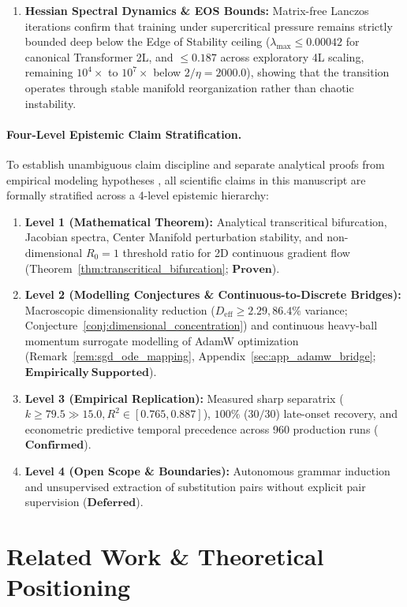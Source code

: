 \documentclass{article}
\theoremstyle{plain}
\theoremstyle{definition}
\begin{document}
\begin{enumerate}[leftmargin=*,itemsep=2pt]
    \item \textbf{Hessian Spectral Dynamics \& EOS Bounds:} Matrix-free Lanczos iterations confirm that training under supercritical pressure remains strictly bounded deep below the Edge of Stability ceiling ($\lambda_{\text{max}} \le 0.00042$ for canonical Transformer 2L, and $\le 0.187$ across exploratory 4L scaling, remaining $10^4\times$ to $10^7\times$ below $2/\eta = 2000.0$), showing that the transition operates through stable manifold reorganization rather than chaotic instability.
\end{enumerate}

\paragraph{Four-Level Epistemic Claim Stratification.}
To establish unambiguous claim discipline and separate analytical proofs from empirical modeling hypotheses \citep{Basri2026CompositionalPreprint}, all scientific claims in this manuscript are formally stratified across a 4-level epistemic hierarchy:
\begin{enumerate}[leftmargin=*,noitemsep]
    \item \textbf{Level 1 (Mathematical Theorem):} Analytical transcritical bifurcation, Jacobian spectra, Center Manifold perturbation stability, and non-dimensional $R_0 = 1$ threshold ratio for 2D continuous gradient flow (Theorem~\ref{thm:transcritical_bifurcation}; $\mathbf{Proven}$).
    \item \textbf{Level 2 (Modelling Conjectures \& Continuous-to-Discrete Bridges):} Macroscopic dimensionality reduction ($D_{\text{eff}} \ge 2.29, 86.4\%$ variance; Conjecture~\ref{conj:dimensional_concentration}) and continuous heavy-ball momentum surrogate modelling of AdamW optimization (Remark~\ref{rem:sgd_ode_mapping}, Appendix~\ref{sec:app_adamw_bridge}; $\mathbf{Empirically\ Supported}$).
    \item \textbf{Level 3 (Empirical Replication):} Measured sharp separatrix ($k \ge 79.5 \gg 15.0, R^2 \in [0.765, 0.887]$), $100\%$ ($30/30$) late-onset recovery, and econometric predictive temporal precedence across 960 production runs ($\mathbf{Confirmed}$).
    \item \textbf{Level 4 (Open Scope \& Boundaries):} Autonomous grammar induction and unsupervised extraction of substitution pairs without explicit pair supervision ($\mathbf{Deferred}$).
\end{enumerate}

\section{Related Work \& Theoretical Positioning}
\label{sec:related_work}
\end{document}
